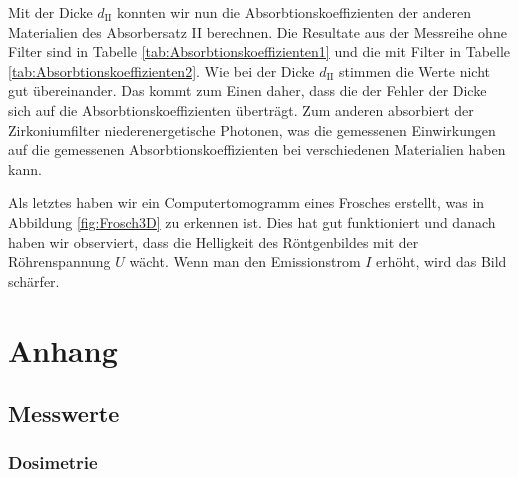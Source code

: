 \documentclass{article}
\begin{document}
Mit der Dicke $d_\text{II}$ konnten wir nun die Absorbtionskoeffizienten der anderen Materialien des Absorbersatz II berechnen. 
Die Resultate aus der Messreihe ohne Filter sind in Tabelle \ref{tab:Absorbtionskoeffizienten1} und die mit Filter in Tabelle \ref{tab:Absorbtionskoeffizienten2}.
Wie bei der Dicke $d_\text{II}$ stimmen die Werte nicht gut übereinander.
Das kommt zum Einen daher, dass die der Fehler der Dicke sich auf die Absorbtionskoeffizienten überträgt.
Zum anderen absorbiert der Zirkoniumfilter niederenergetische Photonen, was die gemessenen Einwirkungen auf die gemessenen Absorbtionskoeffizienten bei verschiedenen Materialien haben kann.

Als letztes haben wir ein Computertomogramm eines Frosches erstellt, was in Abbildung \ref{fig:Frosch3D} zu erkennen ist.
Dies hat gut funktioniert und danach haben wir observiert, dass die Helligkeit des Röntgenbildes mit der Röhrenspannung $U$ wächt.
Wenn man den Emissionstrom $I$ erhöht, wird das Bild schärfer.


\section{Anhang}

\subsection{Messwerte}

\subsubsection{Dosimetrie}
\end{document}
